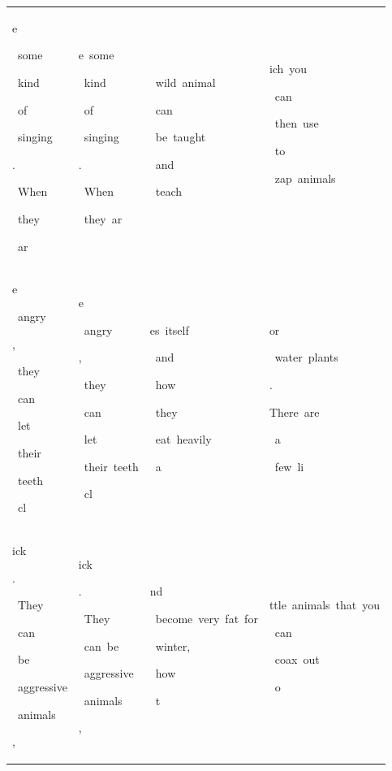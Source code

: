 \begin{table}[h]
\begin{tabular}{ l | l | l | l }
 \colorbox{cm_32!40}{\strut e}\colorbox{cm_30!40}{\strut \ some}\colorbox{cm_34!40}{\strut \ kind}\colorbox{cm_37!40}{\strut \ of}\colorbox{cm_32!40}{\strut \ singing}\colorbox{cm_34!40}{\strut .}\colorbox{cm_35!40}{\strut \ When}\colorbox{cm_26!40}{\strut \ they}\colorbox{cm_34!40}{\strut \ ar} & \colorbox{cm_25!40}{\strut e\ some}\colorbox{cm_0!40}{\strut \ kind}\colorbox{cm_12!40}{\strut \ of}\colorbox{cm_0!40}{\strut \ singing}\colorbox{cm_12!40}{\strut .}\colorbox{cm_0!40}{\strut \ When}\colorbox{cm_12!40}{\strut \ they\ ar} & \colorbox{cm_0!40}{\strut \ wild\ animal}\colorbox{cm_12!40}{\strut \ can}\colorbox{cm_0!40}{\strut \ be\ taught}\colorbox{cm_12!40}{\strut \ and}\colorbox{cm_0!40}{\strut \ teach} & \colorbox{cm_0!40}{\strut ich\ you}\colorbox{cm_12!40}{\strut \ can}\colorbox{cm_0!40}{\strut \ then\ use}\colorbox{cm_12!40}{\strut \ to}\colorbox{cm_0!40}{\strut \ zap\ animals}\colorbox{cm_12!40}{\strut \ } \\ 
 \colorbox{cm_34!40}{\strut e}\colorbox{cm_30!40}{\strut \ angry}\colorbox{cm_27!40}{\strut ,}\colorbox{cm_28!40}{\strut \ they}\colorbox{cm_32!40}{\strut \ can}\colorbox{cm_26!40}{\strut \ let}\colorbox{cm_38!40}{\strut \ their}\colorbox{cm_29!40}{\strut \ teeth}\colorbox{cm_38!40}{\strut \ cl} & \colorbox{cm_12!40}{\strut e}\colorbox{cm_0!40}{\strut \ angry}\colorbox{cm_12!40}{\strut ,}\colorbox{cm_25!40}{\strut \ they}\colorbox{cm_12!40}{\strut \ can}\colorbox{cm_0!40}{\strut \ let}\colorbox{cm_12!40}{\strut \ their\ teeth}\colorbox{cm_0!40}{\strut \ cl} & \colorbox{cm_0!40}{\strut es\ itself}\colorbox{cm_12!40}{\strut \ and}\colorbox{cm_0!40}{\strut \ how}\colorbox{cm_12!40}{\strut \ they}\colorbox{cm_0!40}{\strut \ eat\ heavily}\colorbox{cm_12!40}{\strut \ a} & \colorbox{cm_12!40}{\strut or}\colorbox{cm_0!40}{\strut \ water\ plants}\colorbox{cm_12!40}{\strut .}\colorbox{cm_25!40}{\strut }\colorbox{cm_38!40}{\strut }\colorbox{cm_0!40}{\strut There\ are}\colorbox{cm_12!40}{\strut \ a}\colorbox{cm_0!40}{\strut \ few\ li} \\ 
 \colorbox{cm_38!40}{\strut ick}\colorbox{cm_28!40}{\strut .}\colorbox{cm_35!40}{\strut \ They}\colorbox{cm_28!40}{\strut \ can}\colorbox{cm_27!40}{\strut \ be}\colorbox{cm_28!40}{\strut \ aggressive}\colorbox{cm_48!40}{\strut \ animals}\colorbox{cm_32!40}{\strut ,} & \colorbox{cm_0!40}{\strut ick}\colorbox{cm_12!40}{\strut .}\colorbox{cm_25!40}{\strut \ They}\colorbox{cm_12!40}{\strut \ can\ be}\colorbox{cm_0!40}{\strut \ aggressive}\colorbox{cm_12!40}{\strut \ animals}\colorbox{cm_25!40}{\strut ,} & \colorbox{cm_12!40}{\strut nd}\colorbox{cm_0!40}{\strut \ become\ very\ fat\ for}\colorbox{cm_12!40}{\strut \ winter,}\colorbox{cm_0!40}{\strut \ how}\colorbox{cm_12!40}{\strut \ t} & \colorbox{cm_0!40}{\strut ttle\ animals\ that\ you}\colorbox{cm_12!40}{\strut \ can}\colorbox{cm_0!40}{\strut \ coax\ out}\colorbox{cm_12!40}{\strut \ o} \\ 

\end{tabular}
\end{table}
